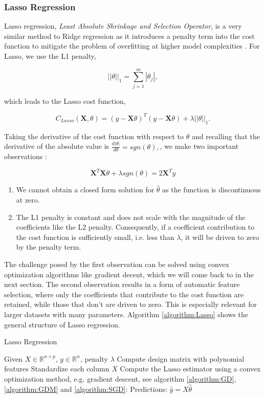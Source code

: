 \documentclass[amssymb,twocolumn,aps]{revtex4}
\begin{document}
\subsubsection{Lasso Regression}

Lasso regression, \textit{Least Absolute Shrinkage and Selection Operator}, is a very similar method to Ridge regression as it introduces a penalty term into the cost function to mitigate the problem of overfitting at higher model complexities \cite{Raschka-et-al-2022}. For Lasso, we use the L1 penalty,

$$||\theta||_1 = \sum^m_{j=1}|\theta_j|,$$

which leads to the Lasso cost function,

$$ C_{Lasso}(\boldsymbol{X}, \theta) = (y - \boldsymbol{X}\theta)^T(y-\boldsymbol{X}\theta) + \lambda ||\theta||_1.$$

Taking the derivative of the cost function with respect to $\theta$ and recalling that the derivative of the absolute value is $\frac{d|\theta|}{d\theta} = sgn(\theta),$, we make two important observations \cite{fysml2}\cite{Hastie-et-al-2009}:

$$\boldsymbol{X}^T\boldsymbol{X} \theta + \lambda sgn(\theta) = 2\boldsymbol{X}^Ty$$

\begin{enumerate}
    \item We cannot obtain a closed form solution for $\hat{\theta}$ as the function is discontinuous at zero.
    \item The L1 penalty is constant and does not scale with the magnitude of the coefficients like the L2 penalty. Consequently, if a coefficient contribution to the cost function is sufficiently small, i.e. less than $\lambda$, it will be driven to zero by the penalty term.
\end{enumerate}

The challenge posed by the first observation can be solved using convex optimization algorithms like gradient decent, which we will come back to in the next section. The second observation results in a form of automatic feature selection, where only the coefficients that contribute to the cost function are retained, while those that don't are driven to zero. This is especially relevant for larger datasets with many parameters. Algorithm \ref{algorithm:Lasso} shows the general structure of Lasso regression.

\begin{algorithm}[H]
    \caption{Lasso Regression}
    \label{algorithm:Lasso}
    \begin{algorithmic}[1]
        \State Given $X \in \mathbb{R}^{n \times p}$, $y \in \mathbb{R}^n$, penalty $\lambda$
        \State Compute design matrix with polynomial features
        \State Standardize each column $X$
        \State Compute the Lasso estimator using a convex optimization method, e.g. gradient descent, see algorithm \ref{algorithm:GD}, \ref{algorithm:GDM} and \ref{algorithm:SGD}:
        \State Predictions: $\hat{y} = X \hat{\theta}$
    \end{algorithmic}
\end{algorithm}
\end{document}
